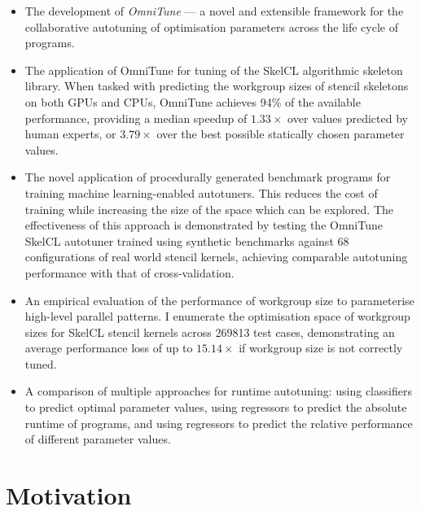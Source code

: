 \begin{itemize}
\item The development of \emph{OmniTune} --- a novel and extensible
  framework for the collaborative autotuning of optimisation
  parameters across the life cycle of programs.
\item The application of OmniTune for tuning of the SkelCL algorithmic
  skeleton library. When tasked with predicting the workgroup sizes of
  stencil skeletons on both GPUs and CPUs, OmniTune achieves 94\% of
  the available performance, providing a median speedup of
  $1.33\times$ over values predicted by human experts, or $3.79\times$
  over the best possible statically chosen parameter values.
\item The novel application of procedurally generated benchmark
  programs for training machine learning-enabled autotuners. This
  reduces the cost of training while increasing the size of the space
  which can be explored. The effectiveness of this approach is
  demonstrated by testing the OmniTune SkelCL autotuner trained using
  synthetic benchmarks against 68 configurations of real world stencil
  kernels, achieving comparable autotuning performance with that of
  cross-validation.
\item An empirical evaluation of the performance of workgroup size to
  parameterise high-level parallel patterns. I enumerate the
  optimisation space of workgroup sizes for SkelCL stencil kernels
  across 269813 test cases, demonstrating an average performance loss
  of up to $15.14\times$ if workgroup size is not correctly tuned.
\item A comparison of multiple approaches for runtime autotuning:
  using classifiers to predict optimal parameter values, using
  regressors to predict the absolute runtime of programs, and using
  regressors to predict the relative performance of different
  parameter values.
\end{itemize}


\section{Motivation}

